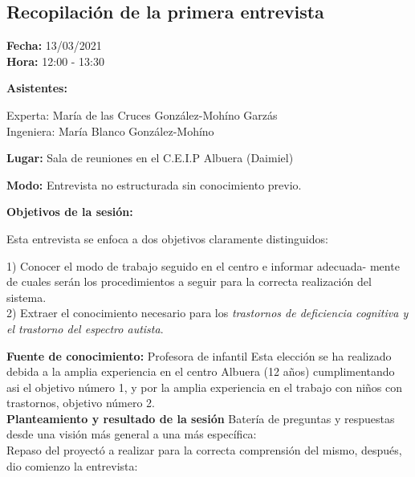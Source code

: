 \documentclass[letterpaper,12pt]{article}
\begin{document}
	\subsection{Recopilación de la primera entrevista}
	\begin{flushleft}
	\textbf{Fecha: }13/03/2021 \\
	\textbf{Hora: }12:00 - 13:30 \\
	
	\end{flushleft} 
	\begin{flushleft}
	\textbf{Asistentes: } \\
	\end{flushleft}
	Experta: María de las Cruces González-Mohíno Garzás\\
	Ingeniera: María Blanco González-Mohíno
	
	\begin{flushleft}
	\textbf{Lugar:} Sala de reuniones en el C.E.I.P Albuera (Daimiel)
	\end{flushleft}
	\begin{flushleft}
	\textbf{Modo:} Entrevista no estructurada sin conocimiento previo.
	\end{flushleft}
	\begin{flushleft}
	\textbf{Objetivos de la sesión:}
	\end{flushleft}
	Esta entrevista se enfoca a dos objetivos claramente distinguidos: \\
	
	\begin{flushleft}
	1) Conocer el modo de trabajo seguido en el centro e informar adecuada-
mente de cuales serán los procedimientos a seguir para la correcta realización
del sistema. \\
	2) Extraer el conocimiento necesario para los \textit{trastornos de deficiencia
cognitiva y el trastorno del espectro autista}.
	\end{flushleft}
	
	\textbf{Fuente de conocimiento: }Profesora de infantil	
	Esta elección se ha realizado debida a la amplia experiencia en el centro Albuera (12 años) cumplimentando asi el objetivo número 1, y por la amplia
experiencia en el trabajo con niños con trastornos, objetivo número 2. \\

\textbf{Planteamiento y resultado de la sesión}
Batería de preguntas y respuestas desde una visión más general a una más
específica: \\
Repaso del proyectó a realizar para la correcta comprensión del mismo,
después, dio comienzo la entrevista: \\
	
\end{document}

